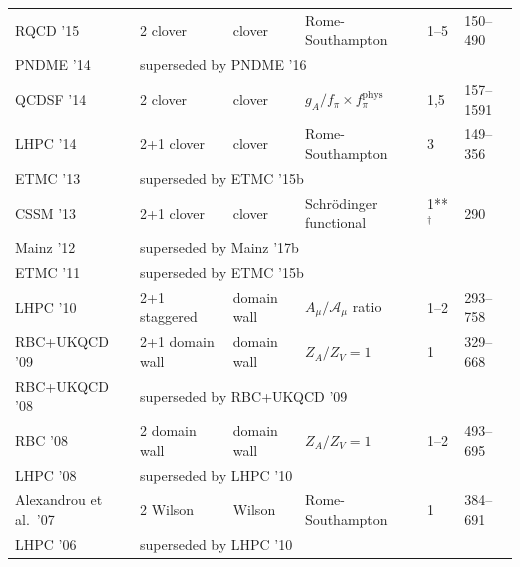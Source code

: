 \begin{table}[t]
{\begin{tabular}{llllll}
  RQCD '15 \cite{Bali:2014nma} &
  2 clover & clover & Rome-Southampton & 1--5 & 150--490\\

  PNDME '14 \cite{Bhattacharya:2013ehc} &
  \multicolumn{5}{l}{superseded by PNDME '16} \\

  QCDSF '14 \cite{Horsley:2013ayv} &
  2 clover & clover & $g_A/f_\pi \times f_\pi^\text{phys}$ & 1,5 & 157--1591 \\

  LHPC '14 \cite{Green:2012ud} &
  2+1 clover & clover & Rome-Southampton & 3 & 149--356\\

  ETMC '13 \cite{Alexandrou:2013joa} &
  \multicolumn{5}{l}{superseded by ETMC '15b} \\

  CSSM '13 \cite{Owen:2012ts} &
  2+1 clover & clover & Schrödinger functional & 1**$^\dagger$ & 290 \\

  Mainz '12 \cite{Capitani:2012gj} &
  \multicolumn{5}{l}{superseded by Mainz '17b} \\

  ETMC '11 \cite{Alexandrou:2011nr} &
  \multicolumn{5}{l}{superseded by ETMC '15b} \\

  LHPC '10 \cite{Bratt:2010jn} &
  2+1 staggered & domain wall & $A_\mu/\mathcal{A}_\mu$ ratio & 1--2 & 293--758 \\

  RBC+UKQCD '09 \cite{Yamazaki:2009zq} &
  2+1 domain wall & domain wall & $Z_A/Z_V=1$ & 1 & 329--668 \\

  RBC+UKQCD '08 \cite{Yamazaki:2008py} &
  \multicolumn{5}{l}{superseded by RBC+UKQCD '09} \\

  RBC '08 \cite{Lin:2008uz} &
  2 domain wall & domain wall & $Z_A/Z_V=1$ & 1--2 & 493--695 \\

  LHPC '08 \cite{Hagler:2007xi} &
  \multicolumn{5}{l}{superseded by LHPC '10} \\

  Alexandrou et al.\ '07 \cite{Alexandrou:2007xj} &
  2 Wilson & Wilson & Rome-Southampton & 1 & 384--691 \\

  LHPC '06 \cite{Edwards:2005ym} &
  \multicolumn{5}{l}{superseded by LHPC '10} \\


\end{tabular}}
\end{table}
